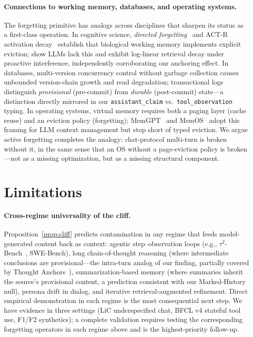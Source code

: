 \documentclass{article}
\begin{document}
\paragraph{Connections to working memory, databases, and operating systems.}
The forgetting primitive has analogs across disciplines that sharpen its status as a first-class operation. In cognitive science, \emph{directed forgetting}~\citep{bjork1972directedforgetting} and ACT-R activation decay~\citep{anderson1998actrarch,kosinski2025actr} establish that biological working memory implements explicit eviction; \citet{wang2025proactive} show LLMs lack this and exhibit log-linear retrieval decay under proactive interference, independently corroborating our anchoring effect. In databases, multi-version concurrency control without garbage collection causes unbounded version-chain growth and read degradation; transactional logs distinguish \emph{provisional} (pre-commit) from \emph{durable} (post-commit) state---a distinction directly mirrored in our \texttt{assistant\_claim} vs.\ \texttt{tool\_observation} typing. In operating systems, virtual memory requires both a paging layer (cache reuse) and an eviction policy (forgetting); MemGPT~\citep{packer2023memgpt} and MemOS~\citep{li2025memos} adopt this framing for LLM context management but stop short of typed eviction. We argue active forgetting completes the analogy: chat-protocol multi-turn is broken without it, in the same sense that an OS without a page-eviction policy is broken---not as a missing optimization, but as a missing structural component.

\section{Limitations}
\label{sec:limitations}

\paragraph{Cross-regime universality of the cliff.}
Proposition~\ref{prop:cliff} predicts contamination in any regime that feeds model-generated content back as context: agentic step--observation loops (e.g., $\tau^2$-Bench~\citep{barres2025tau2bench}, SWE-Bench), long chain-of-thought reasoning (where intermediate conclusions are provisional---the intra-turn analog of our finding, partially covered by Thought Anchors~\citep{thoughtanchors2025}), summarization-based memory (where summaries inherit the source's provisional content, a prediction consistent with our Marked-History null), persona drift in dialog, and iterative retrieval-augmented refinement. Direct empirical demonstration in each regime is the most consequential next step. We have evidence in three settings (LiC underspecified chat, BFCL v4 stateful tool use, F1/F2 synthetics); a complete validation requires testing the corresponding forgetting operators in each regime above and is the highest-priority follow-up.
\end{document}

